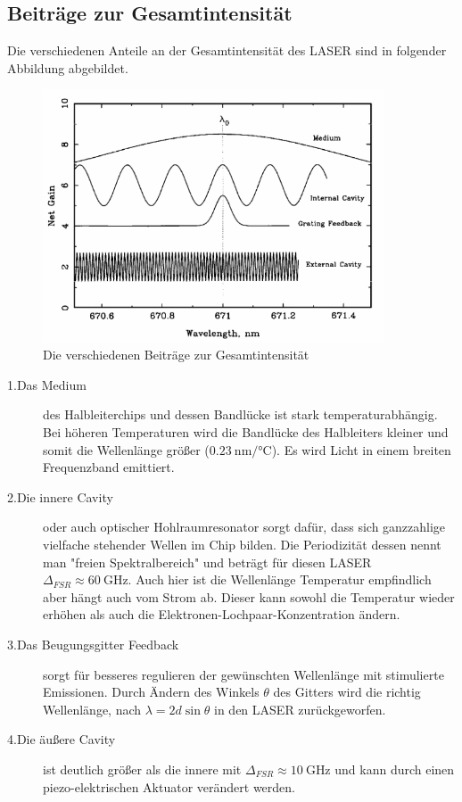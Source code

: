 \newpage
\subsection{Beiträge zur Gesamtintensität}
Die verschiedenen Anteile an der Gesamtintensität des LASER sind in folgender Abbildung abgebildet. 

\begin{figure}[H]
    \centering
    \includegraphics[width=0.9\textwidth]{Bilder/LASER_Moden.png} 
    \caption{Die verschiedenen Beiträge zur Gesamtintensität \cite{man:v60}}
    \label{fig:Moden}
\end{figure}

\begin{description}
    \item[1.Das Medium] des Halbleiterchips und dessen Bandlücke ist stark temperaturabhängig.
    Bei höheren Temperaturen wird die Bandlücke des Halbleiters kleiner und somit die Wellenlänge größer ($\qty{0.23}{\nano\meter\per\celsius}$). 
    Es wird Licht in einem breiten Frequenzband emittiert.
    \item[2.Die innere Cavity] oder auch optischer Hohlraumresonator sorgt dafür, dass sich ganzzahlige vielfache stehender Wellen im Chip bilden.
    Die Periodizität dessen nennt man "freien Spektralbereich" und beträgt für diesen 
    LASER $\Delta_{FSR} \approx  \qty{60}{\giga\hertz}$. 
    Auch hier ist die Wellenlänge Temperatur empfindlich aber hängt auch vom Strom ab. 
    Dieser kann sowohl die Temperatur wieder erhöhen als auch die Elektronen-Lochpaar-Konzentration ändern. 
    \item[3.Das Beugungsgitter Feedback] sorgt für besseres regulieren der gewünschten Wellenlänge mit stimulierte Emissionen. 
    Durch Ändern des Winkels $\theta $ des Gitters wird die richtig Wellenlänge, nach $\lambda =2d \sin\theta $ in den LASER zurückgeworfen. 
    \item[4.Die äußere Cavity] ist deutlich größer als die innere mit $\Delta_{FSR} \approx  \qty{10}{\giga\hertz}$ 
    und kann durch einen piezo-elektrischen Aktuator verändert werden. 
\end{description}

